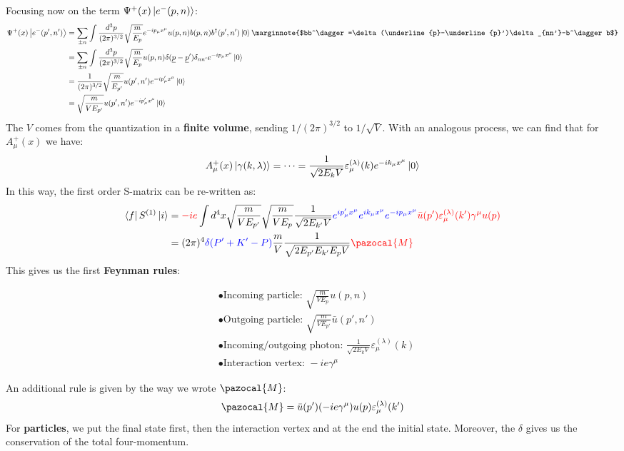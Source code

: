 \documentclass[../main.tex]{subfiles}
\begin{document}
Focusing now on the term $\Psi^+(x)\ket{e^-(p,n)}$:
\begin{align*}
\Psi^+(x)\ket{e^-(p',n')}&=\sum_{\pm n}\int\frac{d^3p}{(2\pi)^{3/2}}\sqrt{\frac{m}{E_p}}e^{-ip_\mu x^\mu}u(p,n)b(p,n)b^\dagger(p',n')\ket{0}\marginnote{$bb^\dagger=\delta(\underline{p}-\underline{p}')\delta_{nn'}-b^\dagger b$}\\
&=\sum_{\pm n}\int\frac{d^3p}{(2\pi)^{3/2}}\sqrt{\frac{m}{E_p}}u(p,n)\delta(\underline{p}-\underline{p}')\delta_{nn'}e^{-ip_\mu x^\mu}\ket{0}\\
&=\frac{1}{(2\pi)^{3/2}}\sqrt{\frac{m}{E_{p'}}}u(p',n')e^{-ip'_\mu x^\mu}\ket{0}\\
&=\sqrt{\frac{m}{VE_{p'}}}u(p',n')e^{-ip'_\mu x^\mu}\ket{0}
\end{align*}
The $V$ comes from the quantization in a \textbf{finite volume}, sending $1/(2\pi)^{3/2}$ to $1/\sqrt{V}$. With an analogous process, we can find that for $A_\mu^+(x)$ we have:
\[
A_\mu^+(x)\ket{\gamma(k,\lambda)}=\dots=\frac{1}{\sqrt{2E_kV}}\varepsilon_\mu^{(\lambda)}(k)e^{-ik_\mu x^\mu}\ket{0}
\]
In this way, the first order S-matrix can be re-written as:
\begin{align*}
\bra{f}S^{(1)}\ket{i}&={\color{red}-ie}\int d^4x\sqrt{\frac{m}{VE_{p'}}}\sqrt{\frac{m}{VE_p}}\frac{1}{\sqrt{2E_{k'}V}}{\color{blue}e^{ip'_\mu x^\mu}e^{ik_\mu x^\mu}e^{-ip_\mu x^\mu}}{\color{red}\bar{u}(p')\varepsilon_\mu^{(\lambda)}(k')\gamma^\mu u(p)}\\
&=(2\pi)^4{\color{blue}\delta(P'+K'-P)}\frac{m}{V}\frac{1}{\sqrt{2E_{p'}E_{k'}E_pV}}{\color{red}\pazocal{M}}
\end{align*}
This gives us the first \textbf{Feynman rules}:
\begin{kaobox}[frametitle=Feynman rules]
\[
\begin{aligned}
&\bullet\text{Incoming particle: } \sqrt{\frac{m}{VE_p}}u(p,n)\\
&\bullet\text{Outgoing particle: } \sqrt{\frac{m}{VE_{p'}}}\bar{u}(p',n')\\
&\bullet\text{Incoming/outgoing photon: } \frac{1}{\sqrt{2E_kV}}\varepsilon_\mu^{(\lambda)}(k)\\
&\bullet\text{Interaction vertex: } -ie\gamma^\mu
\end{aligned}
\]
\end{kaobox}
An additional rule is given by the way we wrote $\pazocal{M}$:
\[
\pazocal{M}=\bar{u}(p')(-ie\gamma^\mu)u(p)\varepsilon^{(\lambda)}_\mu(k')
\]
For \textbf{particles}, we put the final state first, then the interaction vertex and at the end the initial state. Moreover, the $\delta$ gives us the conservation of the total four-momentum. 
\end{document}
